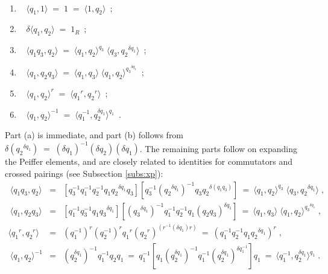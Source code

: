 \begin{lem} \label{lem:Peiffer}  
\quad\\
\vspace{-5mm}
\begin{enumerate}[{\rm (a)}]
\item~ 
$\langle q_1,1 \rangle \;=\; 1 \;=\; \langle 1,q_2 \rangle$~; 
\item~
$\delta \langle q_1,q_2 \rangle \;=\; 1_R$~;
\item~
$\langle q_1q_3,q_2 \rangle 
\;=\; \langle q_1,q_2 \rangle^{q_3}\;\langle q_3,{q_2}^{\delta q_1} \rangle $~;
\item~
$\langle q_1,q_2q_3 \rangle 
\;=\; \langle q_1,q_3 \rangle\;\langle q_1,q_2\rangle^{{q_3}^{\delta q_1}} $~;
\item~
$\langle q_1, q_2 \rangle^r
\;=\;
\langle {q_1}^r,{q_2}^r \rangle$~; 
\item~ 
$\langle q_1,q_2 \rangle^{-1} 
\;=\; \langle q_1^{-1}, q_2^{\delta q_1} \rangle^{q_1}$~. 
\end{enumerate}
\end{lem}
\begin{pf}
Part (a) is immediate, and part (b) follows from  
$\delta({q_2}^{\delta q_1}) \;=\; 
(\delta q_1)^{-1}(\delta q_2)(\delta q_1)$.
The remaining parts follow on expanding the Peiffer elements,
and are closely related to identities for commutators and
crossed pairings (see Subsection \ref{subs:xp}):
\begin{eqnarray*}
~\langle q_1q_3,q_2 \rangle  
& = & 
\left[ q_3^{-1}q_1^{-1}q_2^{-1}q_1{q_2}^{\delta q_1} q_3 \right] 
\left[ q_3^{-1} ({q_2}^{\delta q_1})^{-1} q_3 {q_2}^{\delta(q_1q_3)} \right] 
~=~
\langle q_1,q_2 \rangle ^{q_3}\;\langle q_3, {q_2}^{\delta q_1} \rangle \;, 
\\
~\langle q_1,q_2q_3 \rangle  
& = &
\left[ q_1^{-1}q_3^{-1}q_1 {q_3}^{\delta q_1} \right]  
\left[ ({q_3}^{\delta q_1})^{-1} q_1^{-1}q_2^{-1} q_1 (q_2 q_3)^{\delta q_1} \right] 
~=~
\langle q_1,q_3 \rangle \;
\langle q_1,q_2 \rangle ^{{q_3}^{\delta q_1}} \;, 
\\
\langle {q_1}^r,{q_2}^r \rangle 
& = & 
(q_1^{-1})^r (q_2^{-1})^r {q_1}^r ({q_2}^r)^{(r^{-1}(\delta q_1)r)} 
~=~ 
(q_1^{-1} q_2^{-1} q_1 {q_2}^{\delta q_1})^r \;, 
\\ 
~\langle q_1,q_2 \rangle^{-1} 
& = & 
\left(q_2^{\delta q_1}\right)^{-1}q_1^{-1}q_2q_1 
~=~ q_1^{-1}\left[q_1 \left(q_2^{\delta q_1}\right)^{-1}
      q_1^{-1}\left(q_2^{\delta q_1}\right)^{\delta q_1^{-1}}\right]q_1 
~=~ \langle q_1^{-1}, q_2^{\delta q_1} \rangle^{q_1} \;. 
\end{eqnarray*} 
\end{pf}

